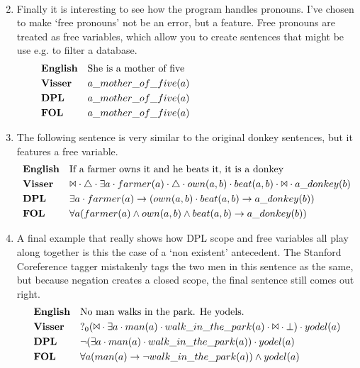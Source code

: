 \documentclass[12pt]{article}
\begin{document}
\begin{enumerate}
\begin{align*}
\end{align*}
\item
Finally it is interesting to see how the program handles pronouns. I've chosen to make `free pronouns' not be an error, but a feature. Free pronouns are treated as free variables, which allow you to create sentences that might be use e.g. to filter a database.
\begin{align*}
&\text{\textbf{English}}&&\text{She is a mother of five}\hspace{15em} \\
&\text{\textbf{Visser}}&&a\_mother\_of\_five(a) \\
&\text{\textbf{DPL}}&&a\_mother\_of\_five(a) \\
&\text{\textbf{FOL}}&&a\_mother\_of\_five(a) \\
\end{align*}
\item
The following sentence is very similar to the original donkey sentences, but it features a free variable.
\begin{align*}
&\text{\textbf{English}}&&\text{If a farmer owns it and he beats it, it is a donkey} \\
&\text{\textbf{Visser}}&&\Bowtie \cdot \triangle \cdot \exists a \cdot farmer(a) \cdot \triangle \cdot own(a,b) \cdot beat(a,b) \cdot \Bowtie \cdot a\_donkey(b) \\
&\text{\textbf{DPL}}&&\exists a \cdot farmer(a) \rightarrow (own(a,b) \cdot beat(a,b) \rightarrow a\_donkey(b)) \\
&\text{\textbf{FOL}}&&\forall a(farmer(a) \wedge own(a,b) \wedge beat(a,b) \rightarrow a\_donkey(b)) \\
\end{align*}
\item
A final example that really shows how DPL scope and free variables all play along together is this the case of a `non existent' antecedent. The Stanford Coreference tagger mistakenly tags the two men in this sentence as the same, but because negation creates a closed scope, the final sentence still comes out right.
\begin{align*}
&\text{\textbf{English}}&&\text{No man walks in the park. He yodels.} \\
&\text{\textbf{Visser}}&&?_0(\Bowtie \cdot \exists a \cdot man(a) \cdot walk\_in\_the\_park(a) \cdot \Bowtie \cdot \bot) \cdot yodel(a) \\
&\text{\textbf{DPL}}&&\neg (\exists a \cdot man(a) \cdot walk\_in\_the\_park(a)) \cdot yodel(a) \\
&\text{\textbf{FOL}}&&\forall a(man(a) \rightarrow \neg walk\_in\_the\_park(a)) \wedge yodel(a) \\
\end{align*}

\end{enumerate}
\end{document}
